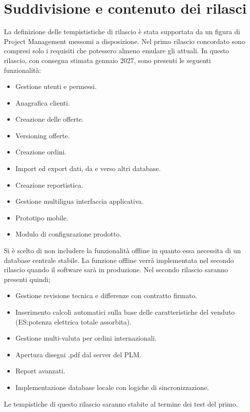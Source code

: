 \section{Suddivisione e contenuto dei rilasci}
La definizione delle tempististiche di rilascio è stata
supportata da un figura di Project Management messomi a disposizione.
Nel primo rilascio concordato sono compresi solo i requisiti che potessero almeno emulare gli attuali.
In questo rilascio, con consegna stimata gennaio 2027, sono presenti le seguenti funzionalità:
\begin{itemize}
    \item Gestione utenti e permessi.
    \item Anagrafica clienti.
    \item Creazione delle offerte.
    \item Versioning offerte.
    \item Creazione ordini.
    \item Import ed export dati, da e verso altri database.
    \item Creazione reportistica.
    \item Gestione multiligua interfaccia applicativa.
    \item Prototipo mobile.
    \item Modulo di configurazione prodotto.
\end{itemize}
Si è scelto di non includere la funzionalità offline
in quanto essa necessita di un database centrale stabile.
La funzione offline verrà implementata nel secondo rilascio quando il software sarà in produzione.
Nel secondo rilascio saranno presenti quindi;
\begin{itemize}
    \item Gestione revisione tecnica e differenze con contratto firmato.
    \item Inserimento calcoli automatici sulla base delle caratteristiche del venduto (ES:potenza elettrica totale assorbita).
    \item Gestione multi-valuta per ordini internazionali.
    \item Apertura disegni .pdf dal server del \ac{PLM}.
    \item Report avanzati.
    \item Implementazione database locale con logiche di sincronizzazione.
\end{itemize}
Le tempistiche di questo rilascio saranno stabite al
termine dei test del primo.
